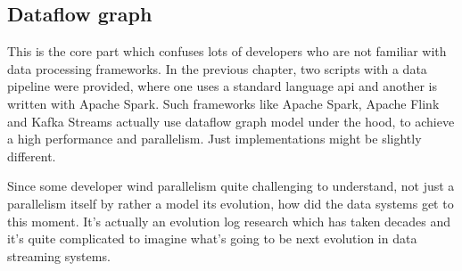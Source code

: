 \subsection{Dataflow graph}\label{subsec:dataflow-graph}
This is the core part which confuses lots of developers who are not familiar
with data processing frameworks.
In the previous chapter, two scripts with a data pipeline were provided, where
one uses a standard language api and another is written with Apache Spark.
Such frameworks like Apache Spark, Apache Flink and Kafka Streams actually
use dataflow graph model under the hood, to achieve a high performance and parallelism.
Just implementations might be slightly different.

Since some developer wind parallelism quite challenging to
understand, not just a parallelism itself by rather a model
its evolution, how did the data systems get to this moment.
It's actually an evolution log research which has taken decades and
it's quite complicated to imagine what's going to be next evolution
in data streaming systems.

